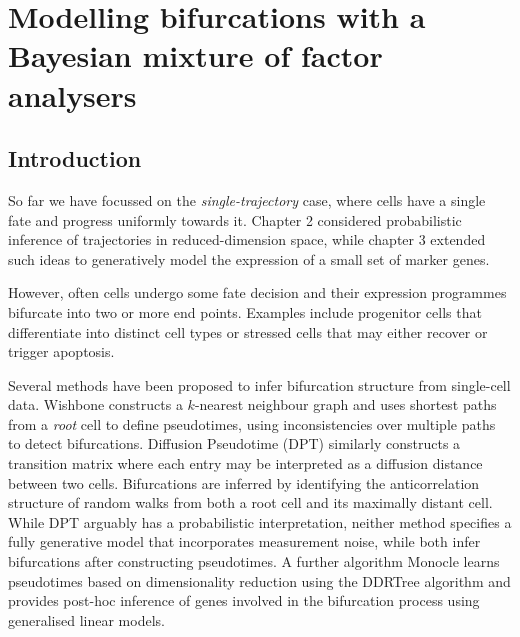 \chapter{Modelling bifurcations with a Bayesian mixture of factor analysers}\label{ch:mfachap} %


\section{Introduction}

%

So far we have focussed on the \emph{single-trajectory} case, where cells have a single fate and progress uniformly towards it. Chapter 2 considered probabilistic inference of trajectories in reduced-dimension space, while chapter 3 extended such ideas to generatively model the expression of a small set of marker genes.

However, often cells undergo some fate decision and their expression programmes bifurcate into two or more end points. Examples include progenitor cells that differentiate into distinct cell types or stressed cells that may either recover or trigger apoptosis.

Several methods have been proposed to infer bifurcation structure from single-cell data. Wishbone \cite{setty2016wishbone} constructs a $k$-nearest neighbour graph and uses shortest paths from a \emph{root} cell to define pseudotimes, using inconsistencies over multiple paths to detect bifurcations.  Diffusion Pseudotime (DPT) \cite{haghverdi2016diffusion} similarly constructs a transition matrix where each entry may be interpreted as a diffusion distance between two cells. Bifurcations are inferred by identifying the anticorrelation structure of random walks from both a root cell and its maximally distant cell. While DPT arguably has a probabilistic interpretation, neither method specifies a fully generative model that incorporates measurement noise, while both infer bifurcations after constructing pseudotimes. A further algorithm Monocle  \cite{Qiu2017-eu} learns pseudotimes based on dimensionality reduction using the DDRTree algorithm \cite{mao2015novel} and provides post-hoc inference of genes involved in the bifurcation process using generalised linear models.

